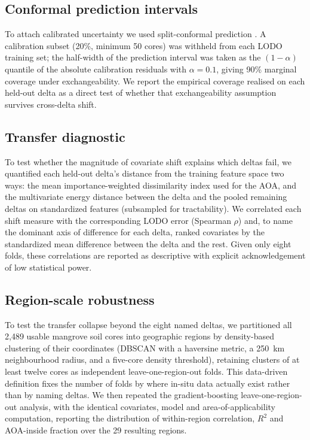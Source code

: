 \documentclass[11pt]{article}
\begin{document}
\subsection{Conformal prediction intervals}
To attach calibrated uncertainty we used split-conformal prediction
\citep{vovk2005,romano2019cqr,angelopoulos2023conformal}. A calibration
subset (20\%, minimum 50 cores) was withheld from each LODO training set; the
half-width of the prediction interval was taken as the $(1-\alpha)$ quantile of the
absolute calibration residuals with $\alpha=0.1$, giving 90\% marginal coverage under
exchangeability. We report the empirical coverage realised on each held-out delta as a
direct test of whether that exchangeability assumption survives cross-delta shift.

\subsection{Transfer diagnostic}
To test whether the magnitude of covariate shift explains which deltas fail, we
quantified each held-out delta's distance from the training feature space two ways: the
mean importance-weighted dissimilarity index used for the AOA, and the multivariate
energy distance between the delta and the pooled remaining deltas on standardized
features (subsampled for tractability). We correlated each shift measure with the
corresponding LODO error (Spearman $\rho$) and, to name the dominant axis of difference
for each delta, ranked covariates by the standardized mean difference between the delta
and the rest. Given only eight folds, these correlations are reported as descriptive
with explicit acknowledgement of low statistical power.

\subsection{Region-scale robustness}
To test the transfer collapse beyond the eight named deltas, we partitioned all 2{,}489
usable mangrove soil cores into geographic regions by density-based clustering of their
coordinates (DBSCAN with a haversine metric, a 250~km neighbourhood radius, and a
five-core density threshold), retaining clusters of at least twelve cores as independent
leave-one-region-out folds. This data-driven definition fixes the number of folds by
where in-situ data actually exist rather than by naming deltas. We then repeated the
gradient-boosting leave-one-region-out analysis, with the identical covariates, model
and area-of-applicability computation, reporting the distribution of within-region
correlation, $R^2$ and AOA-inside fraction over the 29 resulting regions.
\end{document}
